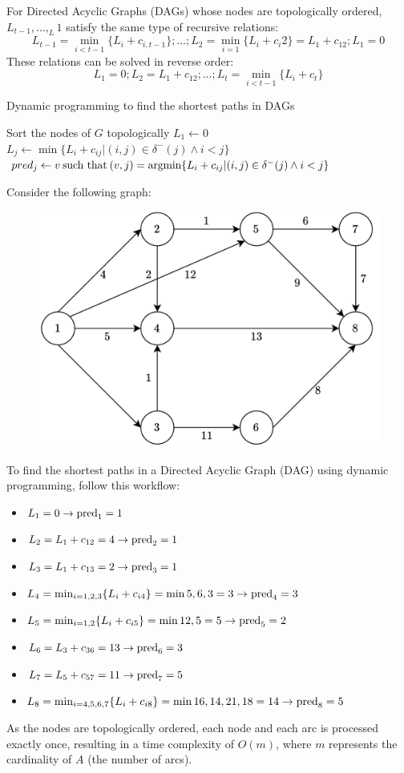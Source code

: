 For Directed Acyclic Graphs (DAGs) whose nodes are topologically ordered, $L_{t-1},\dots,_L1$ satisfy the same type of recursive relations:
\[L_{t-1}=\min_{i<t-1}\{L_i+c_{i,t-1}\};\dots;L_2=\min_{i=1}\{L_i+c_i2\}=L_1+c_{12};L_1=0\]
These relations can be solved in reverse order:
\[L_1=0;L_2=L_1+c_{12};\dots;L_{t}=\min_{i<t-1}\{L_i+c_{t}\}\]
\begin{algorithm}[H]
    \caption{Dynamic programming to find the shortest paths in DAGs}
        \begin{algorithmic}[1]
            \State Sort the nodes of $G$ topologically
            \State $L_1 \leftarrow 0$
                \State $L_j \leftarrow \min\{L_i+c_{ij}|(i,j) \in \delta^{-}(j) \land i < j\}$
                \State $pred_j \leftarrow v \: \textnormal{such that} \: (v,j)=\textnormal{argmin} \{L_i+c_{ij}|(i,j) \in \delta^{-}(j) \land i < j\}$
            \EndFor
        \end{algorithmic}
\end{algorithm}
\begin{example}
    Consider the following graph:
    \begin{figure}[H]
        \centering
        \includegraphics[width=0.4\linewidth]{images/DAG.png}
    \end{figure}
    To find the shortest paths in a Directed Acyclic Graph (DAG) using dynamic programming, follow this workflow:
    \begin{itemize}
        \item $L_1=0 \rightarrow \textnormal{pred}_1=1$
        \item $L_2=L_1+c_{12}=4 \rightarrow \textnormal{pred}_2=1$
        \item $L_3=L_1+c_{13}=2 \rightarrow \textnormal{pred}_3=1$
        \item $L_4=\min_{i=1,2,3}\{L_i+c_{i4}\}=\min{5,6,3}=3 \rightarrow \textnormal{pred}_4=3$
        \item $L_5=\min_{i=1,2}\{L_i+c_{i5}\}=\min{12,5}=5 \rightarrow \textnormal{pred}_5=2$
        \item $L_6=L_3+c_{36}=13 \rightarrow \textnormal{pred}_6=3$
        \item $L_7=L_5+c_{57}=11 \rightarrow \textnormal{pred}_7=5$
        \item $L_8=\min_{i=4,5,6,7}\{L_i+c_{i8}\}=\min{16,14,21,18}=14 \rightarrow \textnormal{pred}_8=5$
    \end{itemize}
\end{example}
As the nodes are topologically ordered, each node and each arc is processed exactly once, resulting in a time complexity of $O(m)$, where $m$ represents the cardinality of $A$ (the number of arcs).    

